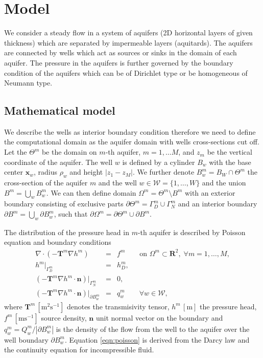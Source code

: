 \documentclass[preprint,12pt]{elsarticle}
\def\vc#1{\mathbf{\boldsymbol{#1}}}     %
\newcommand{\R}{\mathbf{R}}
\begin{document}
\section{Model}
\label{sec:model}
We consider a steady flow in a system of aquifers (2D horizontal layers of given thickness) which are separated by 
impermeable layers (aquitards). The aquifers are connected by wells which act as sources
or sinks in the domain of each aquifer. The pressure in the aquifers is further governed by the boundary 
condition of the aquifers which can be of Dirichlet type or be homogeneous of Neumann type.

\subsection{Mathematical model}
We describe the wells as interior boundary condition therefore we need to define the computational domain
as the aquifer domain with wells cross-sections cut off. Let the $\Theta^m$ be the domain on $m$-th aquifer,
$m=1,\ldots M$, and $z_m$ be the vertical coordinate of the aquifer. The well $w$ is defined by a cylinder $B_w$
with the base center $\vc{x}_w$, radius $\rho_w$ and height $|z_1-z_M|$.  We further denote 
$B^m_w = B_W \cap \Theta^m$ the cross-section of the aquifer $m$ and the well $w\in\mathcal{W}=\{1,\ldots,W\}$
and the union $B^m=\bigcup\limits_{w}B^m_w$. 
We can then define domain $\Omega^m = \Theta^m\setminus B^m$ with an exterior boundary 
consisting of exclusive parts $\partial\Theta^m=\Gamma^m_D\cup\Gamma^m_N$ and an interior boundary 
$\partial B^m=\bigcup\limits_{w}\partial B^m_w$, 
such that $\partial\Omega^m=\partial\Theta^m\cup\partial B^m$.

The distribution of the pressure head in $m$-th aquifer is described by Poisson equation and 
boundary conditions
\begin{eqnarray} \label{eqn:poisson}
\nabla\cdot(-\mathbf{T}^m\nabla h^m) &=& f^m \qquad \textrm{on } \Omega^m\subset\R^2,\; \forall m=1,\dots,M, \\
h^m|_{\Gamma^m_D} &=& h^m_D, \\
\left(-\mathbf{T}^m\nabla h^m\cdot\vc{n}\right)|_{\Gamma^m_N} &=& 0, \\
\left(-\mathbf{T}^m\nabla h^m\cdot\vc{n}\right)|_{\partial B^m_w} &=& q^m_w \qquad \forall w\in\mathcal{W},
\end{eqnarray}
where $\mathbf{T}^m\, [\textrm{m}^2\textrm{s}^{-1}]$ denotes the transmisivity tensor,
$h^m\, [\textrm{m}]$ the pressure head, $f^m\, [\textrm{m}\textrm{s}^{-1}]$ source density,
$\vc{n}$ unit normal vector on the boundary and
$q^m_w = Q^m_w/|\partial B^m_w|$ is the density of the flow from the well to the aquifer over the well boundary 
$\partial B^m_w$. Equation \eqref{eqn:poisson} is derived from the Darcy law and the continuity equation 
for incompressible fluid.
\end{document}
